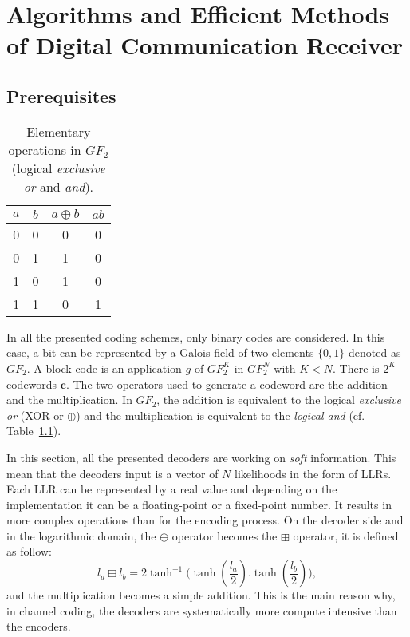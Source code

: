 
\graphicspath{{main/chapter2/fig/}}

\chapter{Algorithms and Efficient Methods of Digital Communication Receiver}
\label{chap:alg}

\vspace*{\fill}
\minitoccustom
\vspace*{\fill}

\newpage
\section{Prerequisites}

\begin{table}[htp]
  \centering
  \caption{Elementary operations in $GF_2$ (logical \emph{exclusive or} and
    \emph{and}).}
  \label{tab:ctx_gf2_operations}
   \begin{tabular}{c c c c}
   $a$ & $b$ & $a \oplus b$ & $ab$ \\
    \hline
    \hline
    0 & 0 & 0 & 0 \\
    0 & 1 & 1 & 0 \\
    1 & 0 & 1 & 0 \\
    1 & 1 & 0 & 1 \\
  \end{tabular}
\end{table}

In all the presented coding schemes, only binary codes are considered. In this
case, a bit can be represented by a Galois field of two elements $\{0, 1\}$
denoted as $GF_2$. A block code is an application $g$ of $GF_2^K$ in $GF_2^N$
with $K < N$. There is $2^K$ codewords $\bm{c}$. The two operators used to
generate a codeword are the addition and the multiplication. In $GF_2$, the
addition is equivalent to the logical \emph{exclusive or} (XOR or $\oplus$) and
the multiplication is equivalent to the \emph{logical and} (cf.
Table~\ref{tab:ctx_gf2_operations}).

In this section, all the presented decoders are working on \emph{soft}
information. This mean that the decoders input is a vector of $N$ likelihoods in
the form of LLRs. Each LLR can be represented by a real value and depending on
the implementation it can be a floating-point or a fixed-point number. It
results in more complex operations than for the encoding process. On the decoder
side and in the logarithmic domain, the $\oplus$ operator becomes the $\boxplus$
operator, it is defined as follow:
\begin{equation}
  l_a \boxplus l_b = 2\tanh^{-1}{\big(\tanh{(\frac{l_a}{2}).\tanh{(\frac{l_b}{2})}}\big)},
\end{equation}
and the multiplication becomes a simple addition. This is the main reason why,
in channel coding, the decoders are systematically more compute intensive than
the encoders.

